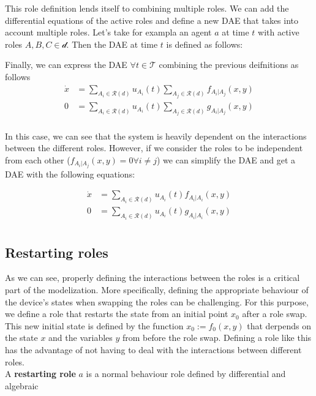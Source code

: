This role definition lends itself to combining multiple roles. We can add the differential equations of the active roles and define  
a new DAE that takes into account multiple roles. Let's take for exampla an agent $a$ at time $t$ with active roles $A,B,C \in \mathcal{d}$. Then the DAE at time $t$ is defined as follows:

Finally, we can express the DAE $\forall t \in \mathcal{T}$ combining the previous deifnitions as follows
\begin{align}
    \dot{x} &= \sum_{A_i \in \mathcal{R}(d)}u_{A_i}(t)\sum_{A_j \in \mathcal{R}(d)} f_{A_i|A_j}(x,y)\\
    0 &= \sum_{A_i \in \mathcal{R}(d)}u_{A_i}(t)\sum_{A_j \in \mathcal{R}(d)} g_{A_i|A_j}(x,y)\\
\end{align}

In this case, we can see that the system is heavily dependent on the interactions between the different roles. However, if we consider the roles to be independent from each other ($f_{A_i|A_j}(x,y) = 0 \forall i \neq j$) we can simplify the DAE and get a DAE with the following equations:

\begin{align}
    \dot{x} &= \sum_{A_i \in \mathcal{R}(d)} u_{A_i}(t)f_{A_i|A_i}(x,y)\\
    0 &= \sum_{A_i \in \mathcal{R}(d)}u_{A_i}(t)g_{A_i|A_i}(x,y)\\
\end{align}

\subsection{Restarting roles}

As we can see, properly defining the interactions between the roles is a critical part of the modelization. More specifically, defining the appropriate behaviour of the device's states when swapping the roles can be challenging. For this purpose, we define a role that restarts the state from an initial point $x_0$ after a role swap. This new initial state is defined by the function $x_0:= f_0(x,y)$ that derpends on the state $x$ and the variables $y$ from before the role swap. Defining a role like this has the advantage of not having to deal with the interactions between different roles.\\

A \textbf{restarting role} $a$ is a normal behaviour role defined by differential and algebraic 

